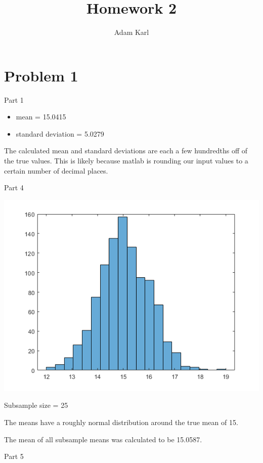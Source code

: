 \documentclass[a4paper]{article}
\title{Homework 2}
\author{Adam Karl}
\begin{document}
\maketitle

\section{Problem 1}
Part 1

\begin{itemize}
    \item mean = 15.0415
    \item standard deviation = 5.0279
\end{itemize}
The calculated mean and standard deviations are each a few hundredths off of the true values. This is likely because matlab is rounding our input values to a certain number of decimal places.

\medskip
\noindent
Part 4


\begin{center}
    \includegraphics[scale=1]{meansHistogram25.png}
    \caption{Subsample size = 25}
\end{center}
The means have a roughly normal distribution around the true mean of 15.

\noindent
The mean of all subsample means was calculated to be 15.0587.

  
\bigskip
\noindent
Part 5
\end{document}
